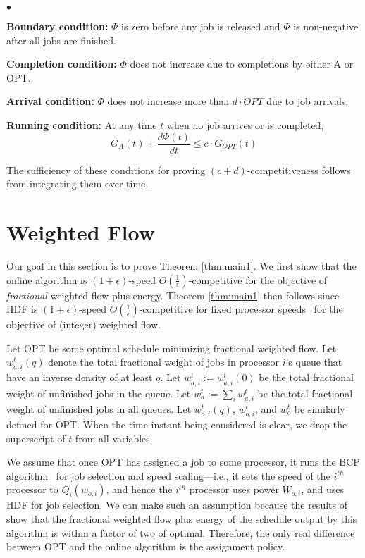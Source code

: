 \documentclass[11pt]{article}
\newcommand{\opt}{\textrm{\sc OPT}\xspace}
\newcommand{\bcp}{{\sf BCP}\xspace}
\newcommand{\initOneLiners}{\setlength{\itemsep}{0pt}
    \setlength{\parsep }{0pt}
    \setlength{\topsep }{0pt}
}
\newenvironment{OneLiners}[1][\ensuremath{\bullet}]
    {\begin{list}
        {#1}
        {\initOneLiners}}
    {\end{list}}
\begin{document}
\begin{OneLiners}
\item[{\bf Boundary condition:}] $\Phi$ is zero before any job is
  released and $\Phi$ is non-negative after all jobs are finished.
\item[{\bf Completion condition:}]
$\Phi$ does not increase due to completions by either A or OPT.
\item[{\bf Arrival condition:}]
$\Phi$ does not increase more than $d \cdot OPT$ due to job arrivals.

\item[{\bf Running condition:}]
  At any time $t$ when no job arrives or is completed,
  \begin{equation}\label{eqn:eq1}
    G_{A}(t) + \frac{d\Phi(t)}{dt} \le c \cdot
    G_{OPT}(t)
  \end{equation}
\end{OneLiners}
The sufficiency of these conditions for proving $(c+d)$-competitiveness
follows from integrating them over time.

\section{Weighted Flow}
\label{sec:weighted-flow-time}

Our goal in this section is to prove Theorem \ref{thm:main1}.
We first show that the online algorithm is $(1+\epsilon)$-speed
$O(\frac{1}{\epsilon})$-competitive for the objective of
\emph{fractional} weighted flow plus energy. Theorem \ref{thm:main1}
then follows since HDF is
$(1+\epsilon)$-speed
$O(\frac{1}{\epsilon})$-competitive for fixed processor speeds~\cite{BLMP1}
for the objective of (integer) weighted flow.

Let \opt be some
optimal schedule minimizing fractional weighted flow.
Let $w_{a,i}^{t}(q)$
denote the total fractional weight of jobs in processor
$i$'s queue that have an inverse density of at least $q$.
Let $w_{a,i}^{t} := w_{a,i}^{t}(0)$ be
the total fractional weight of unfinished jobs in the queue.
Let $w_{a}^{t} := \sum_i w_{a,i}^{t}$ be
the total fractional weight of unfinished jobs in all queues.
Let
$w_{o,i}^{t}(q)$,
$w_{o,i}^{t}$, and
$w_{o}^{t}$ be similarly defined for \opt.
When the time instant being considered is clear, we drop the superscript of $t$ from all variables.



We assume that once \opt
has assigned a job to some processor, it runs the \bcp
algorithm~\cite{BCP} for job selection and speed scaling---i.e., it sets
the speed of the $i^{th}$ processor to $Q_i(w_{o,i})$, and hence
the $i^{th}$ processor uses power $W_{o,i}$,
and uses HDF for job selection.
We can make such an assumption because the results of~\cite{BCP} show that the
fractional weighted flow plus energy of the schedule output by this algorithm is within a factor of two of
optimal.  Therefore, the only real difference between \opt and the online algorithm is the
assignment policy.
\end{document}
